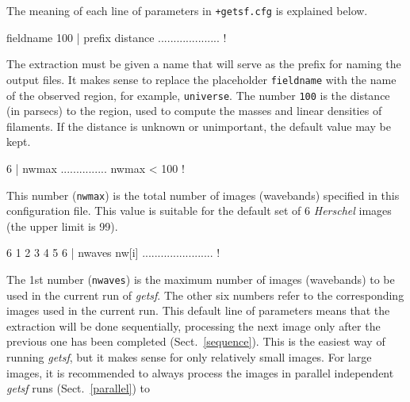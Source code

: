 \documentclass[a4paper,10pt]{article}
\begin{document}
The meaning of each line of parameters in \verb!+getsf.cfg! is explained below.
\begin{verbnobox}[\mbox{}\small]
 fieldname 100       | prefix distance .................... !
\end{verbnobox}
The extraction must be given a name that will serve as the prefix for naming the output files. It makes sense to replace the
placeholder \verb!fieldname! with the name of the observed region, for example, \verb!universe!. The number \verb!100! is the
distance (in parsecs) to the region, used to compute the masses and linear densities of filaments. If the distance is unknown or
unimportant, the default value may be kept.
\begin{verbnobox}[\mbox{}\small]
 6                   | nwmax ...............{ nwmax < 100 } !
\end{verbnobox}
This number (\verb!nwmax!) is the total number of images (wavebands) specified in this configuration file. This value is suitable
for the default set of 6 \emph{Herschel} images (the upper limit is 99).
\begin{verbnobox}[\mbox{}\small]
 6 1 2 3 4 5 6       | nwaves nw[i] ....................... !
\end{verbnobox}
The 1st number (\verb!nwaves!) is the maximum number of images (wavebands) to be used in the current run of \textsl{getsf}. The
other six numbers refer to the corresponding images used in the current run. This default line of parameters means that the
extraction will be done sequentially, processing the next image only after the previous one has been completed
(Sect.~\ref{sequence}). This is the easiest way of running \textsl{getsf}, but it makes sense for only relatively small images. For
large images, it is recommended to always process the images in parallel independent \textsl{getsf} runs (Sect.~\ref{parallel}) to
\end{document}
